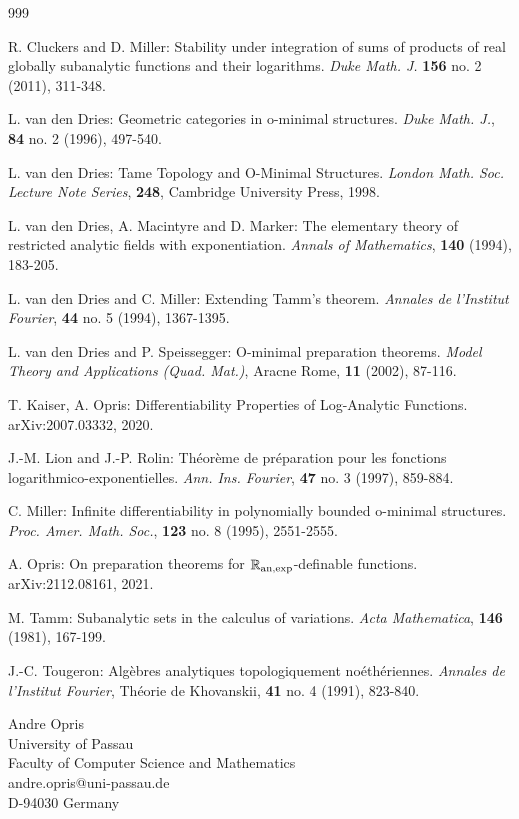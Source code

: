 \documentclass[12pt]{article}
\def\vs{\vspace}
\begin{document}
\newpage
\begin{thebibliography}{999}
	
	 R. Cluckers and D. Miller: Stability under integration of sums of products of real globally subanalytic functions and their logarithms. \textit{Duke Math. J.} \textbf{156} no. 2 (2011), 311-348. 
	
	 L. van den Dries: Geometric categories in o-minimal structures. \textit{Duke Math. J.}, \textbf{84} no. 2 (1996), 497-540.

	 L. van den Dries: Tame Topology and O-Minimal Structures. \textit{London Math. Soc. Lecture Note Series}, \textbf{248}, Cambridge University Press, 1998.

	 L. van den Dries, A. Macintyre and D. Marker: The elementary theory of restricted analytic fields with exponentiation. \textit{Annals of Mathematics}, \textbf{140} (1994), 183-205.
	
	 L. van den Dries and C. Miller: Extending Tamm's theorem. \textit{Annales de l'Institut Fourier}, \textbf{44} no. 5 (1994), 1367-1395.

	 L. van den Dries and P. Speissegger: O-minimal preparation theorems. \textit{Model Theory and Applications (Quad. Mat.)}, Aracne Rome, \textbf{11} (2002), 87-116.
	
	 T. Kaiser, A. Opris: Differentiability Properties of Log-Analytic Functions. arXiv:2007.03332, 2020.  
	
	 J.-M. Lion and J.-P. Rolin: Théorème de préparation pour les fonctions logarithmico-exponentielles. \textit{Ann. Ins. Fourier}, \textbf{47} no. 3 (1997), 859-884.

	 C. Miller: Infinite differentiability in polynomially bounded o-minimal structures. \textit{Proc. Amer. Math. Soc.}, \textbf{123} no. 8 (1995), 2551-2555. 
	
	 A. Opris: On preparation theorems for $\mathbb{R}_{\textnormal{an,exp}}$-definable functions. arXiv:2112.08161, 2021.
	
	 M. Tamm: Subanalytic sets in the calculus of variations. \textit{Acta Mathematica}, \textbf{146} (1981), 167-199.
	
	 J.-C. Tougeron: Algèbres analytiques topologiquement noéthériennes. \textit{Annales de l'Institut Fourier}, Théorie de Khovanskii, \textbf{41} no. 4 (1991), 823-840.	

\end{thebibliography}

\vs{1cm}
Andre Opris\\
University of Passau\\
Faculty of Computer Science and Mathematics\\
andre.opris@uni-passau.de\\
D-94030 Germany
\end{document}
